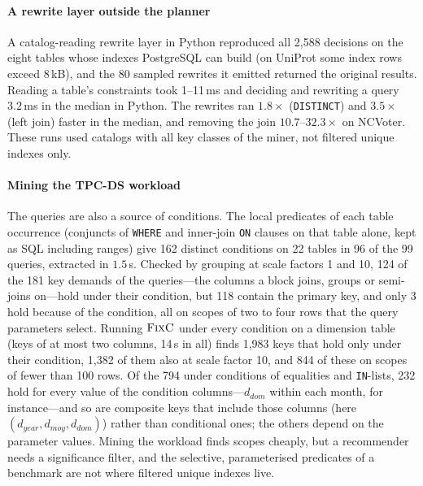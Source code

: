 \documentclass[conference]{IEEEtran}
\theoremstyle{definition}
\newcommand{\sql}[1]{\texttt{#1}}
\begin{document}
\paragraph*{A rewrite layer outside the planner} A catalog-reading rewrite layer in Python reproduced all 2{,}588 decisions on the eight tables whose
indexes PostgreSQL can build (on UniProt some index rows exceed 8\,kB), and the 80 sampled
rewrites it emitted returned the original results. Reading a table's constraints took
1--11\,ms and deciding and rewriting a query $3.2$\,ms in the median in Python. The rewrites ran
$1.8\times$ (\sql{DISTINCT}) and $3.5\times$ (left join) faster in the median, and removing the
join $10.7$--$32.3\times$ on NCVoter. These runs used catalogs with all key classes of the
miner, not filtered unique indexes only.

\paragraph*{Mining the TPC-DS workload} The queries are also a source of conditions. The local
predicates of each table occurrence (conjuncts of \sql{WHERE} and inner-join \sql{ON} clauses on
that table alone, kept as SQL including ranges) give 162 distinct conditions on 22 tables in 96
of the 99 queries, extracted in $1.5$\,s. Checked by grouping at scale factors 1 and 10, 124 of
the 181 key demands of the queries---the columns a block joins, groups or semi-joins on---hold
under their condition, but 118 contain the primary key, and only 3 hold because of the
condition, all on scopes of two to four rows that the query parameters select. Running
$\textsc{FixC}$ under every condition on a dimension table (keys of at most two columns, 14\,s in
all) finds 1{,}983 keys that hold only under their condition, 1{,}382 of them also at scale
factor 10, and 844 of these on scopes of fewer than 100 rows. Of the 794 under conditions of
equalities and \sql{IN}-lists, 232 hold for every value of the condition columns---$d_{dom}$
within each month, for instance---and so are composite keys that include those columns
(here $(d_{year},d_{moy},d_{dom})$) rather than conditional ones; the others depend on the
parameter values. Mining the workload finds scopes cheaply, but a recommender needs a
significance filter, and the selective, parameterised predicates of a benchmark are not where
filtered unique indexes live.

\fi

\end{document}
